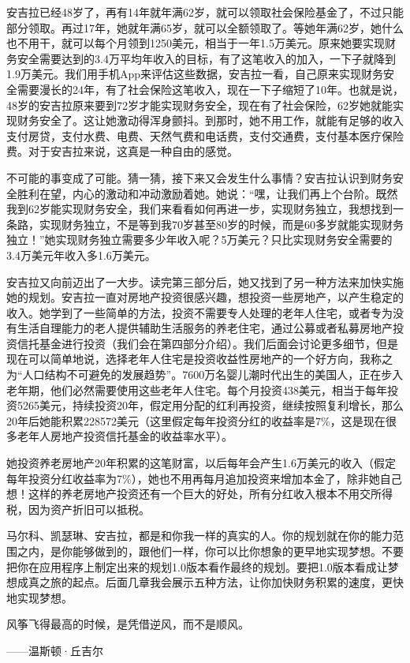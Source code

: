 安吉拉已经48岁了，再有14年就年满62岁，就可以领取社会保险基金了，不过只能部分领取。再过17年，她就年满65岁，就可以全额领取了。等她年满62岁，她什么也不用干，就可以每个月领到1250美元，相当于一年1.5万美元。原来她要实现财务安全需要达到的3.4万平均年收入的目标，有了这笔收入的加入，一下子就降到1.9万美元。我们用手机App来评估这些数据，安吉拉一看，自己原来实现财务安全需要漫长的24年，有了社会保险这笔收入，现在一下子缩短了10年。也就是说，48岁的安吉拉原来要到72岁才能实现财务安全，现在有了社会保险，62岁她就能实现财务安全了。这让她激动得浑身颤抖。到那时，她不用工作，就能有足够的收入支付房贷，支付水费、电费、天然气费和电话费，支付交通费，支付基本医疗保险费。对于安吉拉来说，这真是一种自由的感觉。

不可能的事变成了可能。猜一猜，接下来又会发生什么事情？安吉拉认识到财务安全胜利在望，内心的激动和冲动激励着她。她说：“嘿，让我们再上个台阶。既然我到62岁能实现财务安全，我们来看看如何再进一步，实现财务独立，我想找到一条路，实现财务独立，不是等到我70岁甚至80岁的时候，而是60多岁就能实现财务独立！”她实现财务独立需要多少年收入呢？5万美元？只比实现财务安全需要的3.4万美元年收入多1.6万美元。

安吉拉又向前迈出了一大步。读完第三部分后，她又找到了另一种方法来加快实施她的规划。安吉拉一直对房地产投资很感兴趣，想投资一些房地产，以产生稳定的收入。她学到了一些简单的方法，投资不需要专人处理的老年人住宅，或者专为没有生活自理能力的老人提供辅助生活服务的养老住宅，通过公募或者私募房地产投资信托基金进行投资（我们会在第四部分介绍）。我们后面会讨论更多细节，但是现在可以简单地说，选择老年人住宅是投资收益性房地产的一个好方向，我称之为“人口结构不可避免的发展趋势”。7600万名婴儿潮时代出生的美国人，正在步入老年期，他们必然需要使用这些老年人住宅。每个月投资438美元，相当于每年投资5265美元，持续投资20年，假定用分配的红利再投资，继续按照复利增长，那么20年后她能积累228572美元（这里假定每年投资分红的收益率是7\%，这是现在很多老年人房地产投资信托基金的收益率水平）。

她投资养老房地产20年积累的这笔财富，以后每年会产生1.6万美元的收入（假定每年投资分红收益率为7\%），她也不用再每月追加投资来增加本金了，除非她自己想！这样的养老房地产投资还有一个巨大的好处，所有分红收入根本不用交所得税，因为资产折旧可以抵税。

马尔科、凯瑟琳、安吉拉，都是和你我一样的真实的人。你的规划就在你的能力范围之内，是你能够做到的，跟他们一样，你可以比你想象的更早地实现梦想。不要把你在应用程序上制定出来的规划1.0版本看作最终的规划。要把1.0版本看成让梦想成真之旅的起点。后面几章我会展示五种方法，让你加快财务积累的速度，更快地实现梦想。

\begin{BookQuote}
风筝飞得最高的时候，是凭借逆风，而不是顺风。

\hfill ——温斯顿·丘吉尔
\end{BookQuote}

